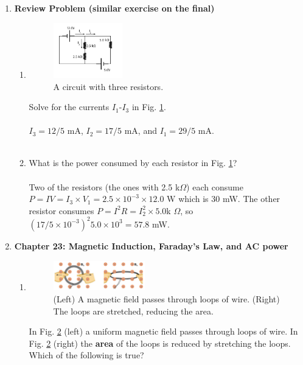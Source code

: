 \documentclass[10pt]{article}
\begin{document}
\begin{enumerate}
\item \textbf{Review Problem (similar exercise on the final)}
\begin{enumerate}
\item 
\begin{figure}[ht]
\centering
\includegraphics[width=0.3\textwidth]{iV.pdf}
\caption{\label{fig:circuit1} A circuit with three resistors.}
\end{figure}
Solve for the currents $I_1$-$I_3$ in Fig. \ref{fig:circuit1}. \\ \\ $I_3 = 12/5$ mA, $I_2 = 17/5$ mA, and $I_1 = 29/5$ mA. \\ \\
\item What is the power consumed by each resistor in Fig. \ref{fig:circuit1}? \\ \\ Two of the resistors (the ones with 2.5 k$\Omega$) each consume $P = IV = I_3 \times V_1 = 2.5 \times 10^{-3} \times 12.0$ W which is 30 mW.  The other resistor consumes $P = I^2 R = I_2^2 \times 5.0 $k $\Omega$, so $(17/5 \times 10^{-3})^2 5.0 \times 10^3 = 57.8$ mW.
\end{enumerate} \clearpage
\item \textbf{Chapter 23: Magnetic Induction, Faraday's Law, and AC power}
\begin{enumerate}
\item
\begin{figure}
\centering
\includegraphics[width=0.4\textwidth]{flux1.png}
\caption{\label{fig:flux1} (Left) A magnetic field passes through loops of wire.  (Right) The loops are stretched, reducing the area.}
\end{figure}
In Fig. \ref{fig:flux1} (left) a uniform magnetic field passes through loops of wire.  In Fig. \ref{fig:flux1} (right) the \textbf{area} of the loops is reduced by stretching the loops.  Which of the following is true?

\end{enumerate}
\end{enumerate}
\end{document}
